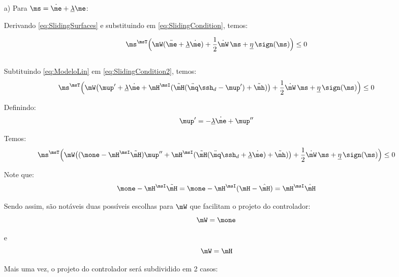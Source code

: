 \documentclass[]{politex}
\begin{document}
\begin{itemize}
\item[a)] Para $\ms = \dot{\me} + \underline{\lambda}\me$:

Derivando \eqref{eq:SlidingSurfaces} e substituindo em \eqref{eq:SlidingCondition}, temos:

\begin{equation} \label{eq:SlidingCondition2}
\ms^\msT \Big(\mW (\ddot{\me} + \underline{\lambda} \dot{\me} ) + \frac{1}{2}\dot{\mW} \, \ms + \underline{\eta} \, \sign(\ms) \Big) \leq 0
\end{equation} \\



Subtituindo \eqref{eq:ModeloLin} em \eqref{eq:SlidingCondition2}, temos:
\begin{equation} \label{eq:SlidingCondition3}
\ms^\msT \Big(\mW \big(\mup' + \underline{\lambda} \dot{\me} + \mH^\msI( \tilde{\mH}(\ddot{\mq}\ssh_d - \mup') + \tilde{\mh} ) \big) + \frac{1}{2}\dot{\mW} \, \ms + \underline{\eta} \, \sign(\ms) \Big) \leq 0
\end{equation}

Definindo:
\begin{equation}
\mup' = - \underline{\lambda} \dot{\me} + \mup''
\end{equation}

Temos:
\begin{equation} \label{eq:SlidingCondition3_}
\ms^\msT \Big(\mW \big( (\mone - \mH^\msI \tilde{\mH} )\mup'' + \mH^\msI( \tilde{\mH}(\ddot{\mq}\ssh_d + \underline{\lambda} \dot{\me}) + \tilde{\mh} ) \big) + \frac{1}{2}\dot{\mW} \, \ms + \underline{\eta} \, \sign(\ms) \Big) \leq 0
\end{equation}

Note que:
\begin{equation}
\mone - \mH^\msI \tilde{\mH} = \mone - \mH^\msI ( \mH - \hat{\mH}) = \mH^\msI \hat{\mH}
\end{equation}

Sendo assim, são notáveis duas possíveis escolhas para $\mW$ que facilitam o projeto do controlador:
\begin{equation} \label{eq:W1}
\mW = \mone
\end{equation}

e
\begin{equation} \label{eq:W2}
\mW = \mH
\end{equation}

Mais uma vez, o projeto do controlador será subdividido em 2 casos:


\end{itemize}
\end{document}
